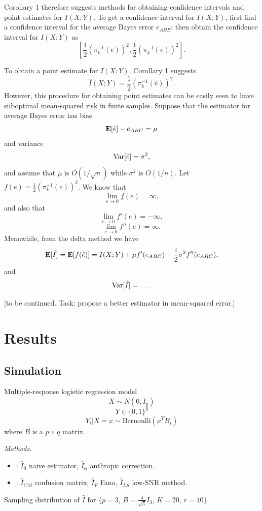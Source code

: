 \documentclass[12pt]{article}
\begin{document}
Corollary 1 therefore suggests methods for obtaining confidence intervals and point estimates for $I(X; Y)$.
To get a confidence interval for $I(X; Y)$, first find a confidence interval for the average Bayes error $e_{ABE}$; then obtain the confidence interval for $I(X; Y)$ as
\[
[\frac{1}{2}(\pi_k^{-1}(\bar{e}))^2, \frac{1}{2}(\pi_k^{-1}(\underline{e}))^2].
\]

To obtain a point estimate for $I(X; Y)$, Corollary 1 suggests
\[\hat{I}(X; Y) = \frac{1}{2}(\pi_k^{-1}(\hat{e}))^2.\]
However, this procedure for obtaining point estimates can be easily seen to have suboptimal mean-squared risk in finite samples.
Suppose that the estimator for average Bayes error has bias
\[
\textbf{E}[\hat{e}] - e_{ABC} = \mu
\]
and variance
\[
\text{Var}[\hat{e}] = \sigma^2,
\]
and assume that $\mu$ is $O(1/\sqrt{n})$ while $\sigma^2$ is $O(1/n)$.
Let $f(e) = \frac{1}{2}(\pi_k^{-1}(e))^2$.
We know that
\[
\lim_{e \to 0} f(e) = \infty,
\]
and also that
\[
\lim_{e \to 0} f'(e) = -\infty,
\]
\[
\lim_{e \to 0} f''(e) = \infty.
\]
Meanwhile, from the delta method we have
\[
\textbf{E}[\hat{I}] = \textbf{E}[f(\hat{e})] = I(X; Y) + \mu f'(e_{ABC}) + \frac{1}{2} \sigma^2 f''(e_{ABC}),
\]
and
\[
\text{Var}[\hat{I}] = \hdots.
\]

[to be continued.  Task: propose a better estimator in mean-squared error.]

\section{Results}

\subsection{Simulation}

Multiple-response logistic regression model
\[
X \sim N(0, I_p)
\]
\[
Y \in \{0,1\}^q
\]
\[
Y_i|X = x \sim \text{Bernoulli}(x^T B_i)
\]
where $B$ is a $p \times q$ matrix.

\emph{Methods.}
\begin{itemize}
\item {}: $\hat{I}_0$ naive estimator, $\hat{I}_\alpha$ anthropic correction.
\item {}: $\hat{I}_{CM}$ confusion matrix, $\hat{I}_F$ Fano, $\hat{I}_{LS}$ low-SNR method.
\end{itemize}

Sampling distribution of $\hat{I}$ for \small{$\{p = 3$, $B = \frac{4}{\sqrt{3}} I_3$, $K = 20$, $r = 40\}$.}
\end{document}
